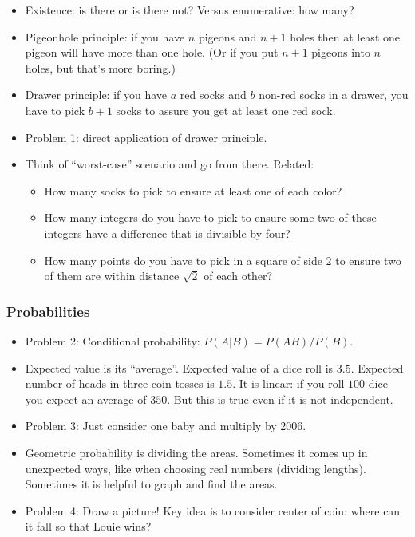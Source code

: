 \documentclass[10pt,paper=letter]{scrartcl}
\begin{document}
\begin{itemize}
  \item Existence: is there or is there not? Versus enumerative: how many?
  \item Pigeonhole principle: if you have $n$ pigeons and $n+1$ holes then at least one pigeon will have more than one hole. (Or if you put $n+1$ pigeons into $n$ holes, but that's more boring.)
  \item Drawer principle: if you have $a$ red socks and $b$ non-red socks in a drawer, you have to pick $b+1$ socks to assure you get at least one red sock. 
  \item Problem 1: direct application of drawer principle.
  \item Think of ``worst-case'' scenario and go from there. Related:
  \begin{itemize}
    \item How many socks to pick to ensure at least one of each color?
    \item How many integers do you have to pick to ensure some two of these integers have a difference that is divisible by four?
    \item How many points do you have to pick in a square of side $2$ to ensure two of them are within distance $\sqrt{2}$ of each other?
  \end{itemize}
\end{itemize}

\newpage

\subsubsection*{Probabilities}

\begin{itemize}
  \item Problem 2: Conditional probability: $P(A|B) = P(AB)/P(B)$.
  \item Expected value is its ``average''. Expected value of a dice roll is $3.5$. Expected number of heads in three coin tosses is $1.5$. It is linear: if you roll $100$ dice you expect an average of $350$. But this is true even if it is not independent.
  \item Problem 3: Just consider one baby and multiply by 2006.
  \item Geometric probability is dividing the areas. Sometimes it comes up in unexpected ways, like when choosing real numbers (dividing lengths). Sometimes it is helpful to graph and find the areas.
  \item Problem 4: Draw a picture! Key idea is to consider center of coin: where can it fall so that Louie wins?
\end{itemize}
\end{document}
